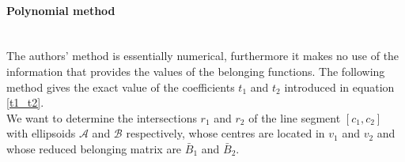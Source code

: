 \documentclass[class=report, float=false, crop=false]{standalone}
\begin{document}
\paragraph{Polynomial method}\mbox{}\\

The authors' method is essentially numerical, furthermore it makes no use of the information that provides the values of the belonging functions. The following method gives the exact value of the coefficients $t_1$ and $t_2$ introduced in equation \ref{t1_t2}.\\

We want to determine the intersections $r_1$ and $r_2$ of the line segment $[c_1,c_2]$ with ellipsoids $\mathcal{A}$ and $\mathcal{B}$ respectively, whose centres are located in $v_1$ and $v_2$ and whose reduced belonging matrix are $\bar{B}_1$ and $\bar{B}_2$.\\
\end{document}
